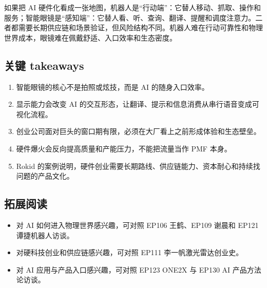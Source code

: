 如果把 AI 硬件化看成一张地图，机器人是“行动端”：它替人移动、抓取、操作和服务；智能眼镜是“感知端”：它替人看、听、查询、翻译、提醒和调度注意力。二者都需要长期供应链和场景验证，但风险结构不同。机器人难在行动可靠性和物理世界成本，眼镜难在佩戴舒适、入口效率和生态密度。

\subsection{关键 takeaways}

\begin{enumerate}
\item 智能眼镜的核心不是拍照或炫技，而是 AI 的随身入口效率。
\item 显示能力会改变 AI 的交互形态，让翻译、提示和信息消费从串行语音变成可视化流程。
\item 创业公司面对巨头的窗口期有限，必须在大厂看上之前形成体验和生态壁垒。
\item 硬件爆火会反向提高质量和产能压力，不能把流量当作 PMF 本身。
\item Rokid 的案例说明，硬件创业需要长期路线、供应链能力、资本耐心和持续找问题的产品文化。
\end{enumerate}

\subsection{拓展阅读}

\begin{itemize}
\item 对 AI 如何进入物理世界感兴趣，可对照 EP106 王鹤、EP109 谢晨和 EP121 谭捷机器人访谈。
\item 对硬科技创业和供应链感兴趣，可对照 EP111 李一帆激光雷达创业史。
\item 对 AI 应用与产品入口感兴趣，可对照 EP123 ONE2X 与 EP130 AI 产品方法论访谈。
\end{itemize}


